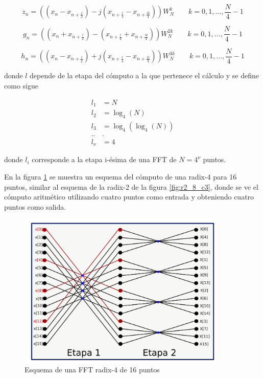 \begin{equation}
z_n = ((x_n - x_{n+\frac{l}{2}}) -j (x_{n+\frac{l}{4}}
-x_{n+\frac{3l}{4}})) W_N^{k} \qquad k = 0,1,\ldots,\frac{N}{4}-1
\label{eq:radix4_subz}
\end{equation}

\begin{equation}
g_n = ((x_n + x_{n+\frac{l}{2}}) - (x_{n+\frac{l}{4}}
+ x_{n+\frac{3l}{4}})) W_N^{2k} \qquad k = 0,1,\ldots,\frac{N}{4}-1
\label{eq:radix4_subg}
\end{equation}

\begin{equation}
h_n = ((x_n - x_{n+\frac{l}{2}}) +j (x_{n+\frac{l}{4}} - x_{n+\frac{3l}{4}})) W_N^{3k} \qquad k = 0,1,\ldots,\frac{N}{4}-1
\label{eq:radix4_subh}
\end{equation}

donde $l$ depende de la etapa del cómputo a la que pertenece el cálculo y se define como sigue

\begin{equation}
\begin{split}
l_1 &= N \\
l_2 &= \log_4(N) \\
l_3 &= \log_4(\log_4(N))\\ 
..&.\\
l_\nu &= 4
\end{split}
\label{eq:radix_4_arit_l}
\end{equation}

donde $l_i$ corresponde a la etapa i-ésima de una FFT de $N=4^\nu$ puntos.

En la figura \ref{fig:r4_diag} se muestra un esquema del cómputo de una radix-4 para 16 puntos,
similar al esquema de la radix-2 de la figura \ref{fig:r2_8_c3}, donde se ve el cómputo aritmético
utilizando cuatro puntos como entrada y obteniendo cuatro puntos como salida.

\begin{figure}[htb!]
        \centering
        \includegraphics[width=10cm]{./figures/r4_16.png}
        \caption{Esquema de una FFT radix-4 de 16 puntos}
        \label{fig:r4_diag}
\end{figure}

